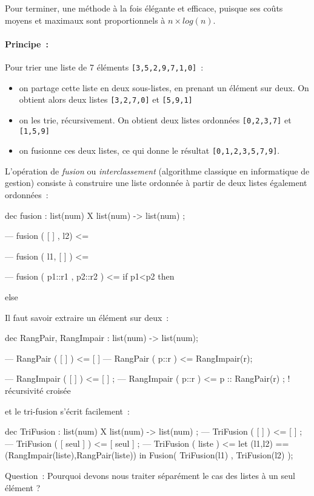Pour terminer, une méthode à la fois élégante et efficace, puisque ses co\^uts moyens et maximaux sont proportionnels à $n \times log(n)$.

\paragraph*{Principe~:} Pour trier une liste de 7 éléments 
\verb+[3,5,2,9,7,1,0]+~:
\begin{itemize}
\item on partage cette liste en deux sous-listes, en prenant un
	 élément sur deux.  On obtient alors deux listes \verb+[3,2,7,0]+ et
	\verb+[5,9,1]+ 
\item on les trie, récursivement. On obtient deux listes
	ordonnées \verb+[0,2,3,7]+ et \verb+[1,5,9]+
\item on fusionne ces deux listes,
	 ce qui donne le résultat \verb+[0,1,2,3,5,7,9]+.
\end{itemize}

L'opération de \emph{fusion} ou \emph{interclassement} (algorithme
classique en informatique de gestion) consiste à construire une liste
ordonnée à partir de deux listes également ordonnées~:
\begin{verbatimtab}
dec fusion : list(num) X list(num) -> list(num) ;

--- fusion ( [ ] , l2) <=

--- fusion ( l1, [ ] ) <=

--- fusion ( p1::r1 , p2::r2 ) <=  if p1<p2     then

                                                else
\end{verbatimtab}

Il faut savoir extraire un élément sur deux~:
\begin{verbatimtab}
dec RangPair, RangImpair : list(num) -> list(num);

--- RangPair ( [ ] ) 	<= [ ]
--- RangPair ( p::r ) 	<= RangImpair(r);

--- RangImpair ( [ ] ) 	<= [ ] ;
--- RangImpair ( p::r ) <= p :: RangPair(r) ;	!  récursivité croisée
\end{verbatimtab}
et le tri-fusion s'écrit facilement~:
\begin{verbatimtab}
dec TriFusion : list(num) X list(num) -> list(num) ;
--- TriFusion ( [ ] ) <= [ ] ;
--- TriFusion ( [ seul ] ) <= [ seul ] ;
--- TriFusion ( liste ) <= let (l1,l2) == (RangImpair(liste),RangPair(liste))
				in Fusion( TriFusion(l1) , TriFusion(l2) );
\end{verbatimtab}
Question~: Pourquoi devons nous traiter séparément le cas des listes à
un seul élément ?



